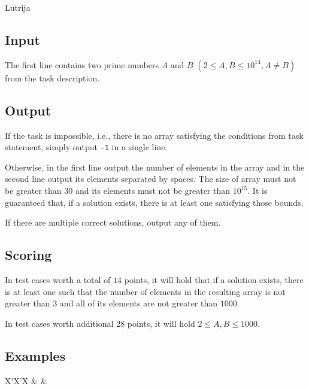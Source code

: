 \begin{statement}[
  problempoints=70,
  timelimit=1 second,
  memorylimit=512 MiB,
]{Lutrija}
\subsection*{Input}
The first line contains two prime numbers $A$ and $B$
$(2 \le A, B \le 10^{14}, A \ne B)$ from the task description.

\subsection*{Output}
If the task is impossible, i.e., there is no array satisfying the conditions
from task statement, simply output \texttt{-1} in a single line.

Otherwise, in the first line output the number of elements in the array and in
the second line output its elements separated by spaces. The size of array must
not be greater than $30$ and its elements must not be greater than $10^{15}$.
It is guaranteed that, if a solution exists, there is at least one satisfying
those bounds.

If there are multiple correct solutions, output any of them.

\subsection*{Scoring}
In test cases worth a total of $14$ points, it will hold that if a solution
exists, there is at least one such that the number of elements in the resulting
array is not greater than $3$ and all of its elements are not greater than $1000$.

In test cases worth additional $28$ points, it will hold $2 \le A, B \le 1000$.

\subsection*{Examples}
\begin{tabularx}{\textwidth}{X'X'X}
 &
 &
\end{tabularx}

\end{statement}

